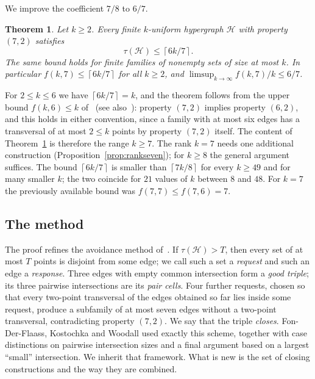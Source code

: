\documentclass[11pt]{article}
\numberwithin{equation}{section}
\newtheorem{theorem}{Theorem}[section]
\theoremstyle{definition}
\theoremstyle{remark}
\newcommand{\HH}{\mathcal H}
\newcommand{\ceil}[1]{\left\lceil #1\right\rceil}
\begin{document}
We improve the coefficient $7/8$ to $6/7$.

\begin{theorem}\label{thm:main}
Let $k\ge2$. Every finite $k$-uniform hypergraph $\HH$ with property
$(7,2)$ satisfies
\[
 \tau(\HH)\le\ceil{6k/7}.
\]
The same bound holds for finite families of nonempty sets of size at
most $k$. In particular $f(k,7)\le\ceil{6k/7}$ for all $k\ge2$, and
$\limsup_{k\to\infty}f(k,7)/k\le6/7$.
\end{theorem}

For $2\le k\le6$ we have $\ceil{6k/7}=k$, and the theorem follows from
the upper bound $f(k,6)\le k$ of~\cite{EFKT} (see also~\cite[Section~1]{FKW}):
property $(7,2)$ implies property $(6,2)$, and this holds in either
convention, since a family with at most six edges has a transversal of
at most $2\le k$ points by property $(7,2)$ itself. The content of
Theorem~\ref{thm:main} is therefore the range $k\ge7$. The rank $k=7$
needs one additional construction (Proposition~\ref{prop:rankseven}); for
$k\ge8$ the general argument suffices. The bound $\ceil{6k/7}$ is smaller
than $\ceil{7k/8}$ for every $k\ge49$ and for many smaller $k$; the two
coincide for $21$ values of $k$ between $8$ and $48$. For $k=7$ the
previously available bound was $f(7,7)\le f(7,6)=7$.

\subsection*{The method}
The proof refines the avoidance method of~\cite{FKW}. If
$\tau(\HH)>T$, then every set of at most $T$ points is disjoint from
some edge; we call such a set a \emph{request} and such an edge a
\emph{response}. Three edges with empty common intersection form a
\emph{good triple}; its three pairwise intersections are its \emph{pair
cells}. Four further requests, chosen so that every two-point
transversal of the edges obtained so far lies inside some request,
produce a subfamily of at most seven edges without a two-point
transversal, contradicting property $(7,2)$. We say that the triple
\emph{closes}. Fon-Der-Flaass, Kostochka and Woodall used exactly this
scheme, together with case distinctions on pairwise intersection sizes
and a final argument based on a largest ``small'' intersection. We
inherit that framework. What is new is the set of closing constructions
and the way they are combined.
\end{document}
